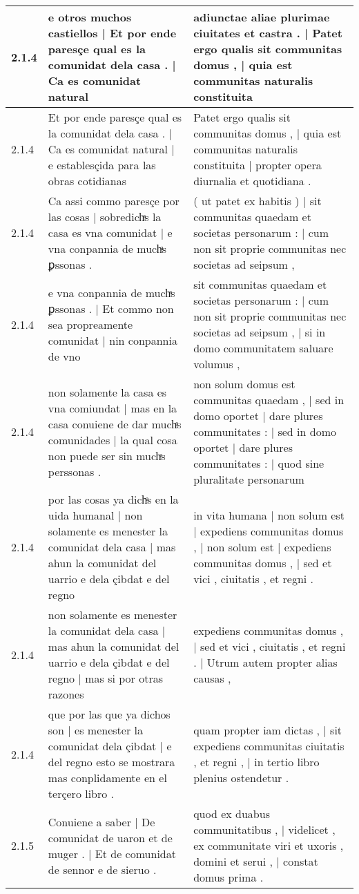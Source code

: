 \begin{tabular}{|p{1cm}|p{6.5cm}|p{6.5cm}|}
2.1.4 & e otros muchos castiellos | Et por ende paresçe qual es la comunidat dela casa . | Ca es comunidat natural & adiunctae aliae plurimae ciuitates et castra . | Patet ergo qualis sit communitas domus , | quia est communitas naturalis constituita \\\hline
2.1.4 & Et por ende paresçe qual es la comunidat dela casa . | Ca es comunidat natural | e establesçida para las obras cotidianas & Patet ergo qualis sit communitas domus , | quia est communitas naturalis constituita | propter opera diurnalia et quotidiana . \\\hline
2.1.4 & Ca assi commo paresçe por las cosas | sobredichͣs la casa es vna comunidat | e vna conpannia de muchͣs ꝑssonas . & ( ut patet ex habitis ) | sit communitas quaedam et societas personarum : | cum non sit proprie communitas nec societas ad seipsum , \\\hline
2.1.4 & e vna conpannia de muchͣs ꝑssonas . | Et commo non sea propreamente comunidat | nin conpannia de vno & sit communitas quaedam et societas personarum : | cum non sit proprie communitas nec societas ad seipsum , | si in domo communitatem saluare volumus , \\\hline
2.1.4 & non solamente la casa es vna comiundat | mas en la casa conuiene de dar muchͣs comunidades | la qual cosa non puede ser sin muchͣs perssonas . & non solum domus est communitas quaedam , | sed in domo oportet | dare plures communitates : | sed in domo oportet | dare plures communitates : | quod sine pluralitate personarum \\\hline
2.1.4 & por las cosas ya dichͣs en la uida humanal | non solamente es menester la comunidat dela casa | mas ahun la comunidat del uarrio e dela çibdat e del regno & in vita humana | non solum est | expediens communitas domus , | non solum est | expediens communitas domus , | sed et vici , ciuitatis , et regni . \\\hline
2.1.4 & non solamente es menester la comunidat dela casa | mas ahun la comunidat del uarrio e dela çibdat e del regno | mas si por otras razones & expediens communitas domus , | sed et vici , ciuitatis , et regni . | Utrum autem propter alias causas , \\\hline
2.1.4 & que por las que ya dichos son | es menester la comunidat dela çibdat | e del regno esto se mostrara mas conplidamente en el terçero libro . & quam propter iam dictas , | sit expediens communitas ciuitatis , et regni , | in tertio libro plenius ostendetur . \\\hline
2.1.5 & Conuiene a saber | De comunidat de uaron et de muger . | Et de comunidat de sennor e de sieruo . & quod ex duabus communitatibus , | videlicet , ex communitate viri et uxoris , domini et serui , | constat domus prima . \\\hline

\end{tabular}
